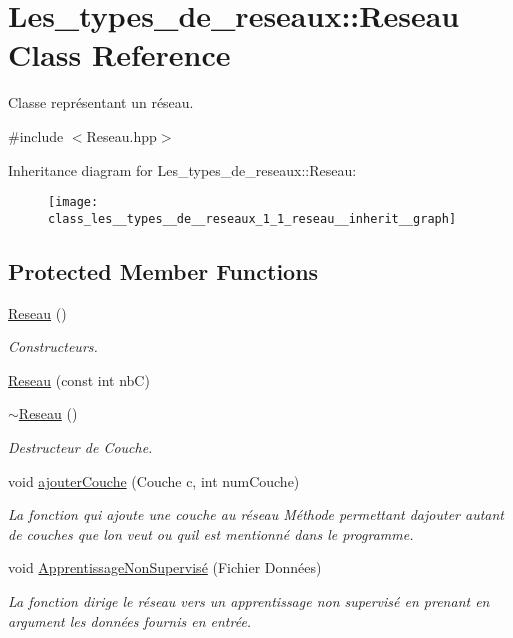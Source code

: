 \hypertarget{class_les__types__de__reseaux_1_1_reseau}{}\section{Les\+\_\+types\+\_\+de\+\_\+reseaux\+:\+:Reseau Class Reference}
\label{class_les__types__de__reseaux_1_1_reseau}


Classe représentant un réseau.  




{\ttfamily \#include $<$Reseau.\+hpp$>$}



Inheritance diagram for Les\+\_\+types\+\_\+de\+\_\+reseaux\+:\+:Reseau\+:\nopagebreak
\begin{figure}[H]
\begin{center}
\leavevmode
\texttt{[image: class\_les\_\_types\_\_de\_\_reseaux\_1\_1\_reseau\_\_inherit\_\_graph]}
\end{center}
\end{figure}
\subsection*{Protected Member Functions}
\begin{DoxyCompactItemize}
\item 
\hyperlink{class_les__types__de__reseaux_1_1_reseau_a793f474e4990cfef96ff6af55d146b96}{Reseau} ()
\begin{DoxyCompactList}\small\item\em Constructeurs. \end{DoxyCompactList}\item 
\hyperlink{class_les__types__de__reseaux_1_1_reseau_a519ad4b3e43d46c5840a9d5196fda003}{Reseau} (const int nbC)
\item 
\hyperlink{class_les__types__de__reseaux_1_1_reseau_ac0ff95d39205854ba7bde14d2edba454}{$\sim$\+Reseau} ()
\begin{DoxyCompactList}\small\item\em Destructeur de Couche. \end{DoxyCompactList}\item 
void \hyperlink{class_les__types__de__reseaux_1_1_reseau_ab254177ffab90f08faa97d7810182049}{ajouter\+Couche} (Couche c, int num\+Couche)
\begin{DoxyCompactList}\small\item\em La fonction qui ajoute une couche au réseau Méthode permettant d\textquotesingle{}ajouter autant de couches que l\textquotesingle{}on veut ou qu\textquotesingle{}il est mentionné dans le programme. \end{DoxyCompactList}\item 
void \hyperlink{class_les__types__de__reseaux_1_1_reseau_a71a35e986b54506ca243f3ccb7984fe5}{Apprentissage\+Non\+Supervisé} (Fichier Données)
\begin{DoxyCompactList}\small\item\em La fonction dirige le réseau vers un apprentissage non supervisé en prenant en argument les données fournis en entrée. \end{DoxyCompactList}\end{DoxyCompactItemize}
